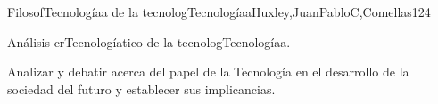 \begin{syllabus}
\begin{unit}{FilosofTecnologíaa de la tecnologTecnologíaa}{Huxley,JuanPabloC,Comellas}{12}{4}
\begin{topics}
      \item {Análisis crTecnologíatico de la tecnologTecnologíaa.}
\end{topics}
\begin{learningoutcomes}
	\item Analizar  y debatir acerca del papel de la Tecnología en el desarrollo de la sociedad del futuro y establecer  sus implicancias. 
\end{learningoutcomes}
\end{unit}



\begin{coursebibliography}
\end{coursebibliography}

\end{syllabus}

%

